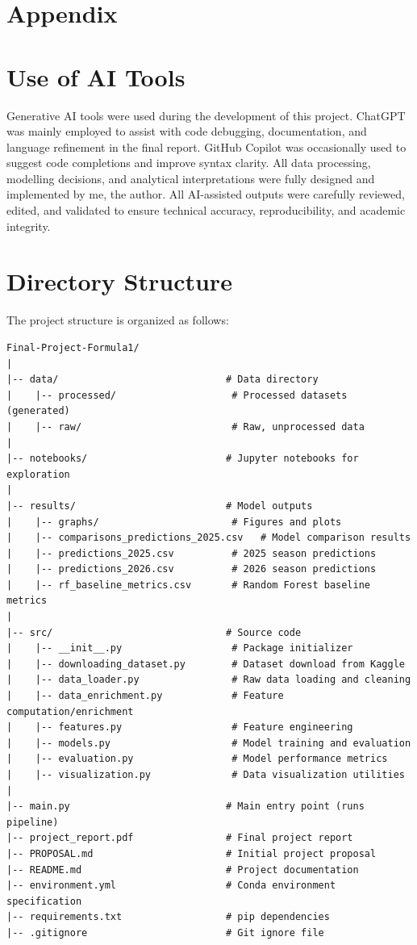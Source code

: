 \documentclass[11pt,a4paper]{article}
\begin{document}

\appendix
\section*{Appendix}

\section{Use of AI Tools}
\label{app:ai}

Generative AI tools were used during the development of this project. ChatGPT was mainly employed to assist with code debugging, documentation, and language refinement in the final report. GitHub Copilot was occasionally used to suggest code completions and improve syntax clarity. All data processing, modelling decisions, and analytical interpretations were fully designed and implemented by me, the author. All AI-assisted outputs were carefully reviewed, edited, and validated to ensure technical accuracy, reproducibility, and academic integrity.

\newpage
\section{Directory Structure}
\label{subsec:directory}

The project structure is organized as follows:

\begin{verbatim}
Final-Project-Formula1/
| 
|-- data/                             # Data directory
|    |-- processed/                    # Processed datasets (generated)
|    |-- raw/                          # Raw, unprocessed data
| 
|-- notebooks/                        # Jupyter notebooks for exploration
| 
|-- results/                          # Model outputs
|    |-- graphs/                       # Figures and plots
|    |-- comparisons_predictions_2025.csv   # Model comparison results
|    |-- predictions_2025.csv          # 2025 season predictions
|    |-- predictions_2026.csv          # 2026 season predictions
|    |-- rf_baseline_metrics.csv       # Random Forest baseline metrics
| 
|-- src/                              # Source code
|    |-- __init__.py                   # Package initializer
|    |-- downloading_dataset.py        # Dataset download from Kaggle
|    |-- data_loader.py                # Raw data loading and cleaning
|    |-- data_enrichment.py            # Feature computation/enrichment
|    |-- features.py                   # Feature engineering
|    |-- models.py                     # Model training and evaluation
|    |-- evaluation.py                 # Model performance metrics
|    |-- visualization.py              # Data visualization utilities
| 
|-- main.py                           # Main entry point (runs pipeline)
|-- project_report.pdf                # Final project report
|-- PROPOSAL.md                       # Initial project proposal
|-- README.md                         # Project documentation
|-- environment.yml                   # Conda environment specification
|-- requirements.txt                  # pip dependencies
|-- .gitignore                        # Git ignore file
\end{verbatim}
\end{document}
